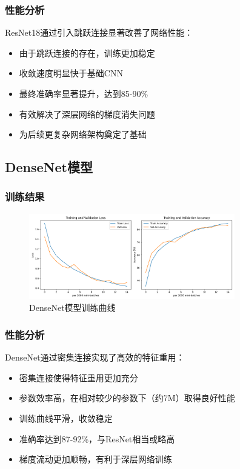 \documentclass[12pt,a4paper]{article}
\begin{document}
\subsubsection{性能分析}
ResNet18通过引入跳跃连接显著改善了网络性能：
\begin{itemize}
    \item 由于跳跃连接的存在，训练更加稳定
    \item 收敛速度明显快于基础CNN
    \item 最终准确率显著提升，达到85-90\%
    \item 有效解决了深层网络的梯度消失问题
    \item 为后续更复杂网络架构奠定了基础
\end{itemize}

\subsection{DenseNet模型}
\subsubsection{训练结果}
\begin{figure}[H]
\centering
\includegraphics[width=0.8\textwidth]{../image/training_curves_densenet.png}
\caption{DenseNet模型训练曲线}
\label{fig:densenet_curves}
\end{figure}

\subsubsection{性能分析}
DenseNet通过密集连接实现了高效的特征重用：
\begin{itemize}
    \item 密集连接使得特征重用更加充分
    \item 参数效率高，在相对较少的参数下（约7M）取得良好性能
    \item 训练曲线平滑，收敛稳定
    \item 准确率达到87-92\%，与ResNet相当或略高
    \item 梯度流动更加顺畅，有利于深层网络训练
\end{itemize}
\end{document}
